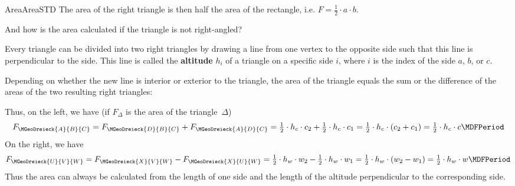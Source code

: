 \begin{MXContent}{Area}{Area}{STD}
The area of the right triangle is then half the area of the rectangle, i.e. 
$ F = \frac{1}{2}\cdot a\cdot b$.

And how is the area calculated if the triangle is not right-angled?

Every triangle can be divided into two right triangles by drawing a line 
from one vertex to the opposite side such that this line is perpendicular to the side. 
This line is called the \textbf{altitude} $h_{i}$ of a triangle on a specific side $i$,
where $i$ is the index of the side $a$, $b$, or $c$. 

Depending on whether the new line is interior or exterior to the triangle,
the area of the triangle equals the sum or the difference of the areas of the two resulting 
right triangles:

\begin{center}
\hspace{4em}
\end{center}

Thus, on the left, we have (if $F_{\Delta}$ is the area of the triangle~$\Delta$)
\[
   F_{\MGeoDreieck{A}{B}{C}}
 = F_{\MGeoDreieck{D}{B}{C}} + F_{\MGeoDreieck{A}{D}{C}}
 = \Mtfrac{1}{2} \cdot h_c \cdot c_2 + \Mtfrac{1}{2} \cdot h_c \cdot c_1
 = \Mtfrac{1}{2} \cdot h_c \cdot \left( c_2 + c_1 \right)
 = \Mtfrac{1}{2} \cdot h_c \cdot c \MDFPeriod
\]
On the right, we have
\[
   F_{\MGeoDreieck{U}{V}{W}}
 = F_{\MGeoDreieck{X}{V}{W}} - F_{\MGeoDreieck{X}{U}{W}}
 = \Mtfrac{1}{2} \cdot h_w \cdot w_2 - \Mtfrac{1}{2} \cdot h_w \cdot w_1
 = \Mtfrac{1}{2} \cdot h_w \cdot \left( w_2 - w_1 \right)
 = \Mtfrac{1}{2} \cdot h_w \cdot w \MDFPeriod
\]
Thus the area can always be calculated from the length of one side and the 
length of the altitude perpendicular to the corresponding side.


\end{MXContent}
